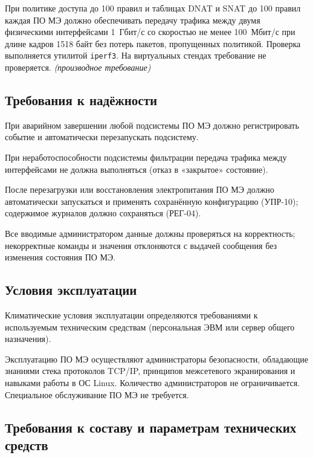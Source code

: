 \documentclass[12pt,a4paper,final]{article}
\newenvironment{reqs}
  {\begin{description}[style=sameline,leftmargin=2.2cm,labelwidth=2.0cm,
     labelsep=0.2cm,font=\normalfont\bfseries,itemsep=3pt]}
  {\end{description}}
\newcommand{\der}{\textit{(производное требование)}}
\begin{document}
\begin{reqs}
\item[ОБР-13] При политике доступа до 100 правил и таблицах DNAT и SNAT
  до 100 правил каждая ПО МЭ должно обеспечивать передачу трафика между
  двумя физическими интерфейсами 1~Гбит/с со скоростью не менее 100~Мбит/с
  при длине кадров 1518 байт без потерь пакетов, пропущенных политикой.
  Проверка выполняется утилитой \texttt{iperf3}. На виртуальных стендах
  требование не проверяется. \der
\end{reqs}

\subsection{Требования к надёжности}

\begin{reqs}
\item[НДЖ-01] При аварийном завершении любой подсистемы ПО МЭ должно
  регистрировать событие и автоматически перезапускать подсистему.
\item[НДЖ-02] При неработоспособности подсистемы фильтрации передача трафика
  между интерфейсами не должна выполняться (отказ в «закрытое» состояние).
\item[НДЖ-03] После перезагрузки или восстановления электропитания ПО МЭ должно
  автоматически запускаться и применять сохранённую конфигурацию (УПР-10);
  содержимое журналов должно сохраняться (РЕГ-04).
\item[НДЖ-04] Все вводимые администратором данные должны проверяться
  на корректность; некорректные команды и значения отклоняются с выдачей
  сообщения без изменения состояния ПО МЭ.
\end{reqs}

\subsection{Условия эксплуатации}

Климатические условия эксплуатации определяются требованиями к используемым
техническим средствам (персональная ЭВМ или сервер общего назначения).

Эксплуатацию ПО МЭ осуществляют администраторы безопасности, обладающие
знаниями стека протоколов TCP/IP, принципов межсетевого экранирования
и навыками работы в ОС Linux. Количество администраторов не ограничивается.
Специальное обслуживание ПО МЭ не требуется.

\subsection{Требования к составу и параметрам технических средств}
\end{document}
